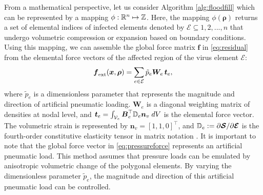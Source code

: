 From a mathematical perspective, let us consider Algorithm \ref{alg:floodfill} which can be represented by a mapping $\phi: \mathbb{R}^n \mapsto {\mathbb{Z}}$. Here, the mapping $\phi(\boldsymbol{\rho})$ returns a set of elemental indices of infected elements denoted by $\mathcal{E} \subseteq {1,2,...,n}$ that undergo volumetric compression or expansion based on boundary conditions. Using this mapping, we can assemble the global force matrix $\boldsymbol{f}$ in \eqref{eq:residual} from the elemental force vectors of the affected region of the virus element $\mathcal{E}$:
%
\begin{equation}
{\boldsymbol{f}}_{\textrm{ext}}(\boldsymbol{x},\boldsymbol{\rho}) = \sum_{e \in \mathcal{E}} \tilde{p}_e \boldsymbol{W}_{\!e} \, \boldsymbol{t}_{e}, \label{eq:pressureforce}
\end{equation}
%
where $\tilde{p}_e$ is a dimensionless parameter that represents the magnitude and direction of artificial pneumatic loading. $\boldsymbol{W}_{\!e}$ is a diagonal weighting matrix of densities at nodal level, and $\boldsymbol{t}_e = \int_{\mathcal{V}_e} {\boldsymbol{B}}_e^\top \mathbb{D}_e {\boldsymbol{n}}_v \; dV$ is the elemental force vector. The volumetric strain is represented by $\boldsymbol{n}_{v} = [1,1,0]^\top$, and $\mathbb{D}_e := \partial \boldsymbol{\mathcal{S}}/\partial \boldsymbol{\mathcal{E}}$ is the fourth-order constitutive elasticity tensor in matrix notation \cite{Renaud2011}. It is important to note that the global force vector in \eqref{eq:pressureforce} represents an artificial pneumatic load. This method assumes that pressure loads can be emulated by anisotropic volumetric change of the polygonal elements. By varying the dimensionless parameter $\tilde{p}_e$, the magnitude and direction of this artificial pneumatic load can be controlled.

